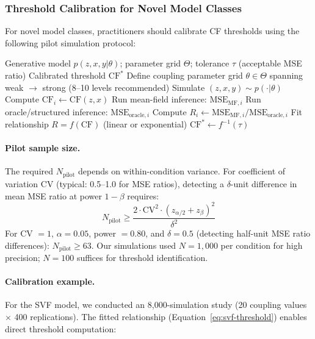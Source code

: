 \documentclass[10pt]{article} %
\theoremstyle{plain}
\theoremstyle{definition}
\begin{document}
\subsubsection{Threshold Calibration for Novel Model Classes}

For novel model classes, practitioners should calibrate CF thresholds using the following pilot simulation protocol:

\begin{algorithm}[H]
\caption{CF Threshold Calibration for Novel Model Classes}
\label{alg:calibration}
\begin{algorithmic}[1]
\Require Generative model $p(z, x, y | \theta)$; parameter grid $\Theta$; tolerance $\tau$ (acceptable MSE ratio)
\Ensure Calibrated threshold $\text{CF}^*$
\State Define coupling parameter grid $\theta \in \Theta$ spanning weak $\to$ strong (8--10 levels recommended)
     
        \State Simulate $(z, x, y) \sim p(\cdot | \theta)$
        \State Compute $\text{CF}_i \gets \text{CF}(z, x)$
        \State Run mean-field inference: $\text{MSE}_{\text{MF},i}$
        \State Run oracle/structured inference: $\text{MSE}_{\text{oracle},i}$
        \State Compute $R_i \gets \text{MSE}_{\text{MF},i} / \text{MSE}_{\text{oracle},i}$
    \EndFor
\EndFor
\State Fit relationship $R = f(\text{CF})$ (linear or exponential)
\State $\text{CF}^* \gets f^{-1}(\tau)$
\end{algorithmic}
\end{algorithm}

\paragraph{Pilot sample size.} The required $N_{\text{pilot}}$ depends on within-condition variance. For coefficient of variation CV (typical: 0.5--1.0 for MSE ratios), detecting a $\delta$-unit difference in mean MSE ratio at power $1 - \beta$ requires:
\begin{equation}
N_{\text{pilot}} \geq \frac{2 \cdot \text{CV}^2 \cdot (z_{\alpha/2} + z_\beta)^2}{\delta^2}
\end{equation}
For CV $= 1$, $\alpha = 0.05$, power $= 0.80$, and $\delta = 0.5$ (detecting half-unit MSE ratio differences): $N_{\text{pilot}} \geq 63$. Our simulations used $N = 1{,}000$ per condition for high precision; $N = 100$ suffices for threshold identification.

\paragraph{Calibration example.} For the SVF model, we conducted an 8,000-simulation study (20 coupling values $\times$ 400 replications). The fitted relationship (Equation~\ref{eq:svf-threshold}) enables direct threshold computation:
\end{document}
